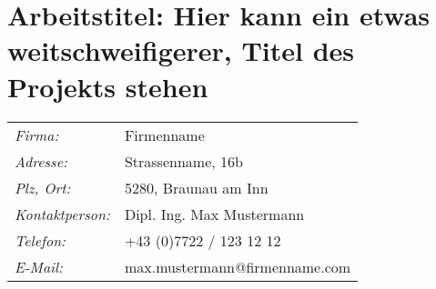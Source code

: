

\chapter*{Arbeitstitel: \newline Hier kann ein etwas weitschweifigerer, Titel des Projekts stehen }






\renewcommand{\arraystretch}{1.5}
\begin{tabularx}{1\textwidth}{@{} l X @{}}

\emph{Firma:} & Firmenname\\
\emph{Adresse:} & Strassenname, 16b\\
\emph{Plz, Ort:} & 5280, Braunau am Inn\\
\emph{Kontaktperson:} & Dipl. Ing. Max Mustermann\\
\emph{Telefon:} & +43 (0)7722 / 123 12 12\\
\emph{E-Mail:} & max.mustermann@firmenname.com\\

\end{tabularx}
